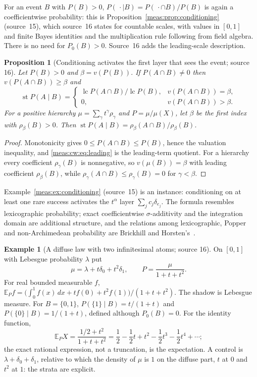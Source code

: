 \documentclass[11pt]{article}
\numberwithin{equation}{section}
\newtheorem{proposition}[theorem]{Proposition}
\theoremstyle{definition}
\newtheorem{example}[theorem]{Example}
\theoremstyle{remark}
\newcommand{\E}{\mathbb E}
\newcommand{\st}{\operatorname{st}}
\newcommand{\lc}{\operatorname{lc}}
\begin{document}
For an event $B$ with $P(B)>0$, $P(\,\cdot\mid B)=P(\,\cdot\cap B)/P(B)$ is again a
coefficientwise probability: this is Proposition~\ref{meas:prop:conditioning}
(source~15), which source~16 states for countable scales, with values in $[0,1]$
and finite Bayes identities and the multiplication rule following from field
algebra. There is no need for $P_0(B)>0$. Source~16 adds the leading-scale
description.

\begin{proposition}[Conditioning activates the first layer that sees the event;
source 16]\label{meas:cw:prop:leading}
Let $P(B)>0$ and $\beta=v(P(B))$. If $P(A\cap B)\ne0$ then $v(P(A\cap B))\ge\beta$ and
\begin{equation}\label{meas:cw:eq:leading}
 \st P(A\mid B)=\begin{cases}
 \lc P(A\cap B)/\lc P(B),& v(P(A\cap B))=\beta,\\
 0,& v(P(A\cap B))>\beta .\end{cases}
\end{equation}
For a positive hierarchy $\mu=\sum_\gamma t^\gamma\rho_\gamma$ and $P=\mu/\mu(X)$, let $\beta$ be
the first index with $\rho_\beta(B)>0$. Then
$\st P(A\mid B)=\rho_\beta(A\cap B)/\rho_\beta(B)$.
\end{proposition}
\begin{proof}
Monotonicity gives $0\le P(A\cap B)\le P(B)$, hence the valuation inequality, and
\eqref{meas:cw:eq:leading} is the leading-term quotient. For a hierarchy every
coefficient $\rho_\gamma(B)$ is nonnegative, so $v(\mu(B))=\beta$ with leading coefficient
$\rho_\beta(B)$, while $\rho_\gamma(A\cap B)\le\rho_\gamma(B)=0$ for $\gamma<\beta$.
\end{proof}

Example~\ref{meas:ex:conditioning} (source~15) is an instance: conditioning on at
least one rare success activates the $t^\alpha$ layer $\sum_jc_j\delta_{e_j}$. The
formula resembles lexicographic probability; exact coefficientwise
$\sigma$-additivity and the integration domain are additional structure, and the
relations among lexicographic, Popper and non-Archimedean probability are
Brickhill and Horsten's~\cite{BH}.

\begin{example}[A diffuse law with two infinitesimal atoms; source 16]
\label{meas:cw:ex:worked}
On $[0,1]$ with Lebesgue probability $\lambda$ put
\begin{equation}\label{meas:cw:eq:worked}
 \mu=\lambda+t\delta_0+t^2\delta_1,\qquad P=\frac{\mu}{1+t+t^2}.
\end{equation}
For real bounded measurable $f$,
$\E_Pf=\bigl(\int_0^1f(x)\,dx+tf(0)+t^2f(1)\bigr)/(1+t+t^2)$. The shadow is
Lebesgue measure. For $B=\{0,1\}$, $P(\{1\}\mid B)=t/(1+t)$ and
$P(\{0\}\mid B)=1/(1+t)$, defined although $P_0(B)=0$. For the identity function,
\[
 \E_PX=\frac{1/2+t^2}{1+t+t^2}=\frac12-\frac12t+t^2-\frac12t^3-\frac12t^4+\cdots ;
\]
the exact rational expression, not a truncation, is the expectation. A control
is $\lambda+\delta_0+\delta_1$, relative to which the density of $\mu$ is $1$ on the
diffuse part, $t$ at $0$ and $t^2$ at $1$: the strata are explicit.
\end{example}
\end{document}
